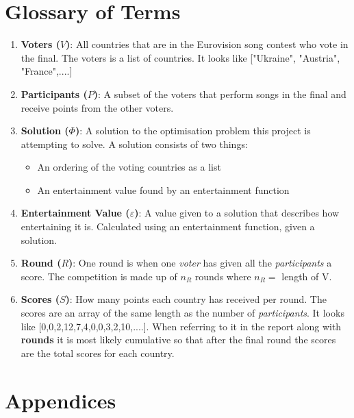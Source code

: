 \documentclass[12pt]{report}
\begin{document}
\clearpage
\section*{Glossary of Terms}\label{glossary}
\begin{enumerate}
\item \textbf{Voters ($V$)}: All countries that are in the Eurovision song contest who vote in the final. The voters is a list of countries. It looks like ["Ukraine", "Austria", "France",....]
\item \textbf{Participants ($P$)}: A subset of the voters that perform songs in the final and receive points from the other voters.
\item \textbf{Solution ($\Phi$)}: A solution to the optimisation problem this project is attempting to solve. A solution consists of two things:
	\begin{itemize}
		\item An ordering of the voting countries as a list
		\item An entertainment value found by an entertainment function
	\end{itemize}
\item \textbf{Entertainment Value ($\varepsilon$)}: A value given to a solution that describes how entertaining it is. Calculated using an entertainment function, given a solution.
\item \textbf{Round ($R$)}: One round is when one \textit{voter} has given all the \textit{participants} a score. The competition is made up of $n_R$ rounds where $n_R = $ length of V.
\item \textbf{Scores ($S$)}: How many points each country has received per round. The scores are an array of the same length as the number of \textit{participants}. It looks like [0,0,2,12,7,4,0,0,3,2,10,....]. When referring to it in the report along with \textbf{rounds} it is most likely cumulative so that after the final round the scores are the total scores for each country.
\end{enumerate}


\section*{Appendices}
\end{document}
